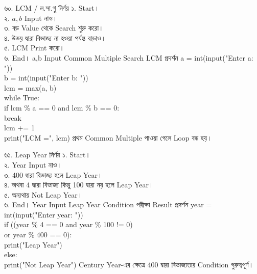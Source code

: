 \exerciseTable
{৬০. LCM / ল.সা.গু নির্ণয়}
{
১. Start।\\
২. \(a,b\) Input নাও।\\
৩. বড় Value থেকে Search শুরু করো।\\
৪. উভয় দ্বারা বিভাজ্য না হওয়া পর্যন্ত বাড়াও।\\
৫. LCM Print করো।\\
৬. End।
}
{
\linearflow
{a,b Input}
{Common Multiple Search}
{LCM প্রদর্শন}
}
{
a = int(input("Enter a: "))\\
b = int(input("Enter b: "))\\
lcm = max(a, b)\\
while True:\\
\hspace*{4mm}if lcm \% a == 0 and lcm \% b == 0:\\
\hspace*{8mm}break\\
\hspace*{4mm}lcm += 1\\
print("LCM =", lcm)
}
{
প্রথম Common Multiple পাওয়া গেলে Loop বন্ধ হয়।
}


\exerciseTable
{৬১. Leap Year নির্ণয়}
{
১. Start।\\
২. Year Input নাও।\\
৩. 400 দ্বারা বিভাজ্য হলে Leap Year।\\
৪. অথবা 4 দ্বারা বিভাজ্য কিন্তু 100 দ্বারা নয় হলে Leap Year।\\
৫. অন্যথায় Not Leap Year।\\
৬. End।
}
{
\linearflow
{Year Input}
{Leap Year Condition পরীক্ষা}
{Result প্রদর্শন}
}
{
year = int(input("Enter year: "))\\
if ((year \% 4 == 0 and year \% 100 != 0)\\
\hspace*{8mm}or year \% 400 == 0):\\
\hspace*{4mm}print("Leap Year")\\
else:\\
\hspace*{4mm}print("Not Leap Year")
}
{
Century Year-এর ক্ষেত্রে 400 দ্বারা বিভাজ্যতার Condition গুরুত্বপূর্ণ।
}



